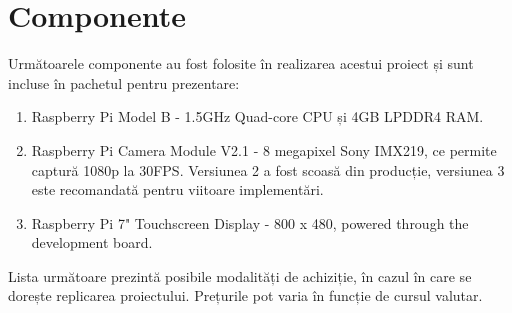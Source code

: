 \pagebreak
\section{Componente}

Următoarele componente au fost folosite în realizarea acestui proiect și sunt incluse în pachetul pentru prezentare:
\begin{enumerate}
	\item Raspberry Pi Model B - 1.5GHz Quad-core CPU și 4GB LPDDR4 RAM.
	\item Raspberry Pi Camera Module V2.1 - 8 megapixel Sony IMX219, ce permite captură 1080p la 30FPS.
	      Versiunea 2 a fost scoasă din producție, versiunea 3 este recomandată pentru viitoare implementări.
	\item Raspberry Pi 7" Touchscreen Display - 800 x 480, powered through the development board.
\end{enumerate}

Lista următoare prezintă posibile modalități de achiziție, în cazul în care se dorește replicarea proiectului.
Prețurile pot varia în funcție de cursul valutar.

